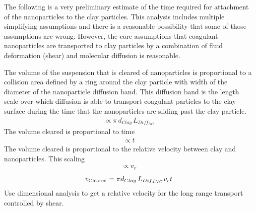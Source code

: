 \documentclass[letterpaper,10pt,english]{sphinxmanual}
\begin{document}
The following is a very preliminary estimate of the time required for attachment of the nanoparticles to the clay particles. This analysis includes multiple simplifying assumptions and there is a reasonable possibility that some of those assumptions are wrong. However, the core assumptions that coagulant nanoparticles are transported to clay particles by a combination of fluid deformation (shear) and molecular diffusion is reasonable.

The volume of the suspension that is cleared of nanoparticles is proportional to a collision area defined by a ring around the clay particle with width of the diameter of the nanoparticle diffusion band. This diffusion band is the length scale over which diffusion is able to transport coagulant particles to the clay surface during the time that the nanoparticles are sliding past the clay particle.
\begin{equation}\label{equation:Rapid_Mix/RM_Theory_and_Future_Work:Rapid_Mix/RM_Theory_and_Future_Work:25}
\begin{split}\propto \pi \, d_{Clay} \, L_{Diff_{NC}}\end{split}
\end{equation}
The volume cleared is proportional to time
\begin{equation}\label{equation:Rapid_Mix/RM_Theory_and_Future_Work:Rapid_Mix/RM_Theory_and_Future_Work:26}
\begin{split}\propto t\end{split}
\end{equation}
The volume cleared is proportional to the relative velocity between clay and nanoparticles. This scaling
\begin{equation}\label{equation:Rapid_Mix/RM_Theory_and_Future_Work:Rapid_Mix/RM_Theory_and_Future_Work:27}
\begin{split}\propto v_r\end{split}
\end{equation}\begin{equation}\label{equation:Rapid_Mix/RM_Theory_and_Future_Work:Rapid_Mix/RM_Theory_and_Future_Work:28}
\begin{split}\bar v_{\rm{Cleared}} = \pi  d_{Clay} \, L_{Diff_{NC}}  v_r  t\end{split}
\end{equation}
Use dimensional analysis to get a relative velocity for the long range transport controlled by shear.
\end{document}
